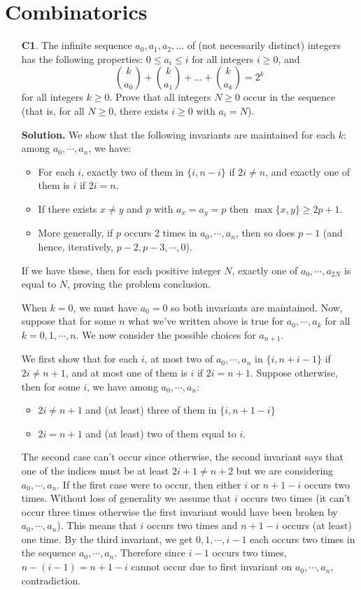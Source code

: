 \documentclass[11pt,a4paper]{article}
\begin{document}
\section*{Combinatorics}
\begin{enumerate}
	\item [\textbf{C1}.] The infinite sequence $a_0,a _1, a_2, \dots$ of (not necessarily distinct) integers has the following properties: $0\le a_i \le i$ for all integers $i\ge 0$, and \[\binom{k}{a_0} + \binom{k}{a_1} + \dots + \binom{k}{a_k} = 2^k\]for all integers $k\ge 0$. Prove that all integers $N\ge 0$ occur in the sequence (that is, for all $N\ge 0$, there exists $i\ge 0$ with $a_i=N$).
	
	\textbf{Solution.} We show that the following invariants are maintained for each $k$: among $a_0, \cdots , a_n$, we have: 
	\begin{itemize}
		\item For each $i$, exactly two of them in $\{i, n-i\}$ if $2i\neq n$, and exactly one of them is $i$ if $2i=n$. 
		
		\item If there exists $x\neq y$ and $p$ with $a_x=a_y=p$ then $\max\{x, y\}\ge 2p+1$. 
		
		\item More generally, if $p$ occurs 2 times in $a_0, \cdots, a_n$, then so does $p-1$ (and hence, iteratively, $p-2, p-3, \cdots, 0$). 
	\end{itemize}
	If we have these, then for each positive integer $N$, exactly one of $a_0, \cdots, a_{2N}$ is equal to $N$, proving the problem conclusion. 
	
	When $k=0$, we must have $a_0=0$ so both invariants are maintained. Now, suppose that for some $n$ what we've written above is true for $a_0, \cdots , a_k$ for all $k=0, 1, \cdots , n$. We now consider the possible choices for $a_{n+1}$. 
	
	We first show that for each $i$, at most two of $a_0, \cdots , a_n$ in $\{i, n+i-1\}$ if $2i\neq n+1$, and at most one of them is $i$ if $2i=n+1$. Suppose otherwise, then for some $i$, we have among $a_0, \cdots , a_n$: 
	\begin{itemize}
		\item $2i\neq n+1$ and (at least) three of them in $\{i, n+1-i\}$
		\item $2i=n+1$ and (at least) two of them equal to $i$. 
	\end{itemize}
	The second case can't occur since otherwise, the second invariant says that one of the indices must be at least $2i+1\neq n+2$ but we are considering $a_0, \cdots , a_n$. If the first case were to occur, then either $i$ or $n+1-i$ occurs two times. Without loss of generality we assume that $i$ occurs two times (it can't occur three times otherwise the first invariant would have been broken by $a_0, \cdots , a_n$). This means that $i$ occurs two times and $n+1-i$ occurs (at least) one time. By the third invariant, we get $0, 1, \cdots , i-1$ each occurs two times in the sequence $a_0, \cdots , a_n$. Therefore since $i-1$ occurs two times, $n-(i-1)=n+1-i$ cannot occur due to first invariant on $a_0, \cdots , a_n$, contradiction. 
	

\end{enumerate}
\end{document}
